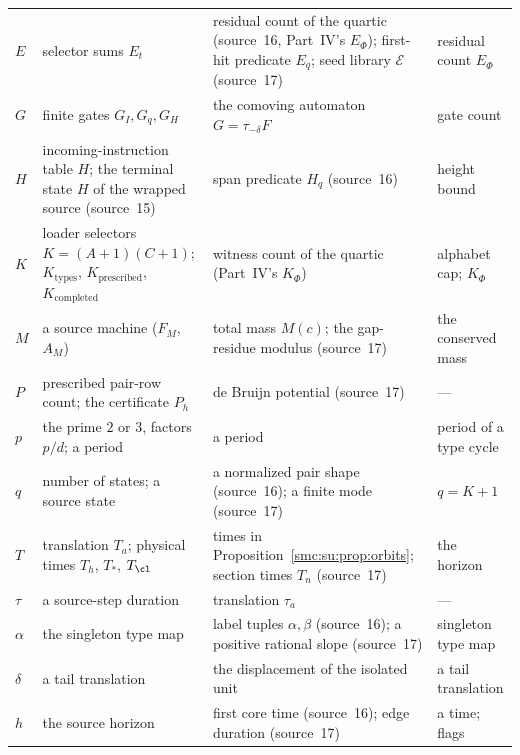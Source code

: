 \documentclass[11pt,letterpaper]{article}
\numberwithin{equation}{section}
\theoremstyle{definition}
\theoremstyle{remark}
\begin{document}
\begin{center}
\begin{longtable}{@{}L{0.06\textwidth}L{0.36\textwidth}L{0.32\textwidth}L{0.16\textwidth}@{}}
$E$ & selector sums $E_t$ & residual count of the quartic (source~16, Part~IV's $E_\Phi$); first-hit predicate $E_q$; seed library $\mathcal E$ (source~17) & residual count $E_\Phi$\\
$G$ & finite gates $G_I,G_q,G_H$ & the comoving automaton $G=\tau_{-\delta}F$ & gate count\\
$H$ & incoming-instruction table $H$; the terminal state $H$ of the wrapped source (source~15) & span predicate $H_q$ (source~16) & height bound\\
$K$ & loader selectors $K=(A+1)(C+1)$; $K_{\mathrm{types}}$, $K_{\mathrm{prescribed}}$, $K_{\mathrm{completed}}$ & witness count of the quartic (Part~IV's $K_\Phi$) & alphabet cap; $K_\Phi$\\
$M$ & a source machine ($F_M$, $A_M$) & total mass $M(c)$; the gap-residue modulus (source~17) & the conserved mass\\
$P$ & prescribed pair-row count; the certificate $P_h$ & de Bruijn potential (source~17) & ---\\
$p$ & the prime $2$ or $3$, factors $p/d$; a period & a period & period of a type cycle\\
$q$ & number of states; a source state & a normalized pair shape (source~16); a finite mode (source~17) & $q=K+1$\\
$T$ & translation $T_a$; physical times $T_h$, $T_\ast$, $T_{\cl}$ & times in Proposition~\ref{smc:su:prop:orbits}; section times $T_n$ (source~17) & the horizon\\
$\tau$ & a source-step duration & translation $\tau_a$ & ---\\
$\alpha$ & the singleton type map & label tuples $\alpha,\beta$ (source~16); a positive rational slope (source~17) & singleton type map\\
$\delta$ & a tail translation & the displacement of the isolated unit & a tail translation\\
$h$ & the source horizon & first core time (source~16); edge duration (source~17) & a time; flags\\
\bottomrule
\end{longtable}
\addtocounter{table}{-1}
\end{center}
\end{document}
